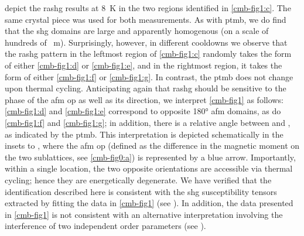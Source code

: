  depict the \gls{rashg} results at \qty{8}{K} in the two regions identified in \cref{cmb-fig1:c}.
The same crystal piece was used for both measurements.
As with \gls{ptmb}, we do find that the \gls{shg} domains are large and apparently homogenous (on a scale of hundreds of \si{\mu m}).
Surprisingly, however, in different cooldowns we observe that the \gls{rashg} pattern in the leftmost region of \cref{cmb-fig1:c} randomly takes the form of either \cref{cmb-fig1:d} or \cref{cmb-fig1:e}, and in the rightmost region, it takes the form of either \cref{cmb-fig1:f} or \cref{cmb-fig1:g}.
In contrast, the \gls{ptmb} does not change upon thermal cycling.
Anticipating again that \gls{rashg} should be sensitive to the phase of the \gls{afm} \gls{op} as well as its direction, we interpret \cref{cmb-fig1} as follows: \cref{cmb-fig1:d} and \cref{cmb-fig1:e} correspond to opposite \ang{180} \gls{afm} domains, as do \cref{cmb-fig1:f} and \cref{cmb-fig1:g}; in addition, there is a relative angle between  and , as indicated by the \gls{ptmb}.
This interpretation is depicted schematically in the insets to , where the \gls{afm} \gls{op} (defined as the difference in the magnetic moment on the two  sublattices, see \cref{cmb-fig0:a}) is represented by a blue arrow.
Importantly, within a single location, the two opposite orientations are accessible via thermal cycling; hence they are energetically degenerate.
We have verified that the identification described here is consistent with the \gls{shg} susceptibility tensors\citep{boyd} extracted by fitting the data in \cref{cmb-fig1} (see ).
In addition, the data presented in \cref{cmb-fig1} is not consistent with an alternative interpretation involving the interference of two independent order parameters (see ).


